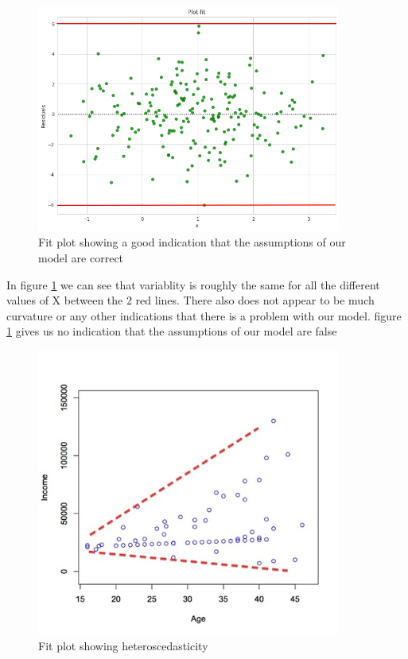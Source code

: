 \begin{figure}[H]
  \centering
  \includegraphics[scale=0.5,width=100mm]{./images/plotfit-good.png}
  \caption{Fit plot showing a good indication that the assumptions of our model are correct}
  \label{fig:fitsplotgood}
\end{figure}

In figure \ref{fig:fitsplotgood} we can see that variablity is roughly the same for all the different values of X between the 2 red lines. There also does not appear to be much curvature or any other indications that there is a problem with our model. figure \ref{fig:fitsplotgood} gives us no indication that the assumptions of our model are false


\begin{figure}[H]
  \centering
  \includegraphics[scale=0.5,width=100mm]{./images/heteroscedasticity.jpg}
  \caption{Fit plot showing heteroscedasticity}
  \label{fig:fitsplotbad}
\end{figure}

